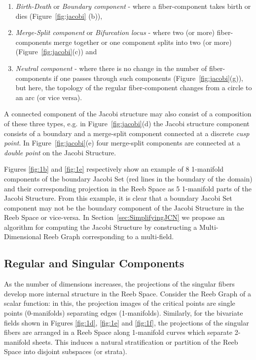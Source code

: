 \documentclass[twocolumn]{article}
\newcommand{\twofigref}[2]{Figures \ref{fig:#1} and \ref{fig:#2}}
\newcommand{\threefigref}[3]{Figures \ref{fig:#1}, \ref{fig:#2} and \ref{fig:#3}}
\begin{document}
\begin{enumerate}
\item \emph{Birth-Death} or \emph{Boundary component} - where a fiber-component takes
birth or dies (Figure~\ref{fig:jacobi} (b)), 
\item \emph{Merge-Split component} or \emph{Bifurcation locus} - where
  two (or more) fiber-components merge together or one component splits into two (or more) (Figure~\ref{fig:jacobi}(c))
and 
\item \emph{Neutral component} - where there is no
change in the number of fiber-components if one passes through such
components (Figure~\ref{fig:jacobi}(g)), but here, the topology of the regular fiber-component changes from a circle to an arc (or vice versa).
\end{enumerate}
A connected component of the Jacobi structure may also consist of a composition of these
three types, e.g. in Figure~\ref{fig:jacobi}(d) the Jacobi structure
component consists of a boundary and a merge-split
component connected at a discrete \emph{cusp point}. In
Figure~\ref{fig:jacobi}(e) four merge-split components are connected
at a \emph{double point} on the Jacobi Structure.

\twofigref{1b}{1e} respectively show an example of 8 1-manifold components
of the boundary Jacobi Set (red lines in the boundary of the domain) and their
corresponding projection in the Reeb Space as 5 1-manifold parts of
the  Jacobi Structure. From this example, it is clear
that a boundary Jacobi Set component may not be the boundary
component of the Jacobi Structure in the Reeb Space or vice-versa. 
In Section~\ref{sec:SimplifyingJCN} we propose an algorithm for computing the Jacobi Structure
by constructing a Multi-Dimensional Reeb Graph corresponding to a multi-field.

\subsection{Regular and Singular Components}
As the number of dimensions increases, the projections of the singular fibers
develop more internal structure in the Reeb Space.
Consider the Reeb Graph of a scalar function: in this, the projection
images of the critical points are single points (0-manifolds)
separating edges (1-manifolds). Similarly, for the bivariate fields
shown in \threefigref{1d}{1e}{1f}, the projections of the
singular fibers are arranged in a Reeb Space along 1-manifold curves which separate 2-manifold sheets.
This induces a natural stratification or partition of the Reeb Space
into disjoint subspaces (or strata).
\end{document}
